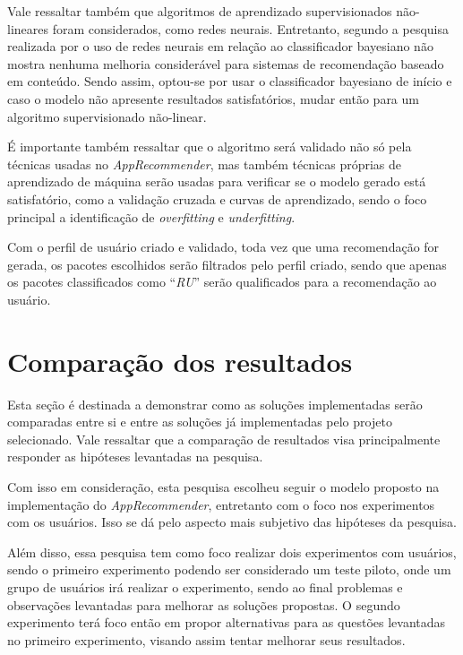 Vale ressaltar também que algoritmos de aprendizado supervisionados não-lineares foram considerados, como redes neurais. Entretanto, segundo
a pesquisa realizada por \cite{pazzani1997learning} o uso de redes neurais em relação ao classificador bayesiano não mostra nenhuma melhoria
considerável para sistemas de recomendação baseado em conteúdo. Sendo assim, optou-se por usar o
classificador bayesiano de início e caso o modelo não apresente
resultados satisfatórios, mudar então para um algoritmo supervisionado não-linear.

É importante também ressaltar que o algoritmo será validado não só pela técnicas
usadas no \textit{AppRecommender}, mas também técnicas próprias de
aprendizado de máquina serão usadas para verificar se o modelo gerado está
satisfatório, como a validação cruzada e curvas de aprendizado, sendo o foco principal a
identificação de \textit{overfitting} e \textit{underfitting}.

Com o perfil de usuário criado e validado, toda vez que uma recomendação for gerada, os pacotes escolhidos serão filtrados pelo perfil criado,
sendo que apenas os pacotes classificados como ``\textit{RU}'' serão qualificados para a recomendação ao usuário.

\section{Comparação dos resultados}

Esta seção é destinada a demonstrar como as soluções implementadas serão
comparadas entre si e entre as soluções já implementadas pelo projeto
selecionado. Vale ressaltar que a comparação de resultados visa principalmente
responder as hipóteses levantadas na pesquisa.

Com isso em consideração, esta pesquisa escolheu seguir o modelo proposto na
implementação do \textit{AppRecommender}, entretanto com o foco nos experimentos
com os usuários. Isso se dá pelo aspecto mais subjetivo das hipóteses da
pesquisa.

Além disso, essa pesquisa tem como foco realizar dois experimentos com usuários,
sendo o primeiro experimento podendo ser considerado um teste piloto, onde um
grupo de usuários irá realizar o experimento, sendo ao final problemas e
observações levantadas para melhorar as soluções propostas. O segundo
experimento terá foco então em propor alternativas para as questões levantadas
no primeiro experimento, visando assim tentar melhorar seus resultados.


